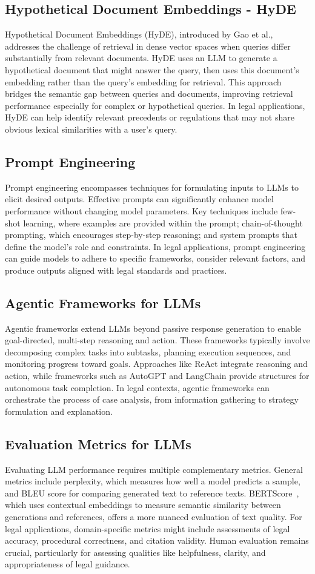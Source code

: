 \subsection{Hypothetical Document Embeddings - HyDE}
Hypothetical Document Embeddings (HyDE), introduced by Gao et al.\cite{gao2022}, 
addresses the challenge of retrieval in dense vector spaces when queries 
differ substantially from relevant documents. HyDE uses an LLM to generate a 
hypothetical document that might answer the query, then uses this document's embedding rather 
than the query's embedding for retrieval. This approach bridges the semantic gap between queries 
and documents, improving retrieval performance especially for complex or hypothetical queries. In legal 
applications, HyDE can help identify relevant precedents or regulations that may not share obvious lexical 
similarities with a user's query\cite{gao2022}.
\subsection{Prompt Engineering}
Prompt engineering encompasses techniques for formulating inputs to LLMs to 
elicit desired outputs. Effective prompts can significantly enhance model 
performance without changing model parameters. Key techniques include few-shot 
learning, where examples are provided within the prompt; chain-of-thought prompting, 
which encourages step-by-step reasoning; and system prompts that define the model's role 
and constraints. In legal applications, prompt engineering can guide models to adhere 
to specific frameworks, consider relevant factors, and produce outputs aligned with 
legal standards and practices.
\subsection{Agentic Frameworks for LLMs}
Agentic frameworks extend LLMs beyond passive response generation to enable goal-directed, 
multi-step reasoning and action. These frameworks typically involve decomposing complex 
tasks into subtasks, planning execution sequences, and monitoring progress toward goals. 
Approaches like ReAct integrate reasoning and action, while frameworks such
as AutoGPT and LangChain provide structures for autonomous task completion. 
In legal contexts, agentic frameworks can orchestrate the process of case analysis, 
from information gathering to strategy formulation and explanation.
\subsection{Evaluation Metrics for LLMs}
Evaluating LLM performance requires multiple complementary metrics. General metrics 
include perplexity, which measures how well a model predicts a sample, 
and BLEU score for comparing generated text to reference texts. 
BERTScore~\cite{zhang2020bertscoreevaluatingtextgeneration}, which uses contextual 
embeddings to measure semantic similarity between generations and references, 
offers a more nuanced evaluation of text quality. For legal applications, 
domain-specific metrics might include assessments of legal accuracy, 
procedural correctness, and citation validity. Human evaluation remains crucial, 
particularly for assessing qualities like helpfulness, clarity, and appropriateness 
of legal guidance.
